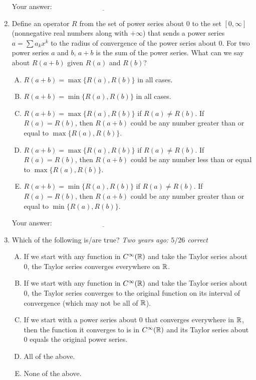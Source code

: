 \documentclass[10pt]{amsart}
\begin{document}
\begin{enumerate}
  \vspace{0.05in}
  Your answer: $\underline{\qquad\qquad\qquad\qquad\qquad\qquad\qquad}$
  \vspace{0.05in}

\item Define an operator $R$ from the set of power series about $0$
  to the set $[0,\infty]$ (nonnegative real numbers along with
  $+\infty$) that sends a power series $a = \sum a_kx^k$ to the radius
  of convergence of the power series about $0$. For two power series
  $a$ and $b$, $a + b$ is the sum of the power series. What can we say
  about $R(a + b)$ given $R(a)$ and $R(b)$?

  \begin{enumerate}[(A)]
  \item $R(a + b) = \max \{ R(a), R(b) \}$ in all cases.
  \item $R(a + b) = \min \{ R(a), R(b) \}$ in all cases.
  \item $R(a + b) = \max \{ R(a), R(b) \}$ if $R(a) \ne R(b)$. If
    $R(a) = R(b)$, then $R(a + b)$ could be any number greater than or
    equal to $\max \{ R(a), R(b) \}$.
  \item $R(a + b) = \max \{ R(a), R(b) \}$ if $R(a) \ne R(b)$. If
    $R(a) = R(b)$, then $R(a + b)$ could be any number less than or
    equal to $\max \{ R(a), R(b) \}$.
  \item $R(a + b) = \min \{ R(a), R(b) \}$ if $R(a) \ne R(b)$. If
    $R(a) = R(b)$, then $R(a + b)$ could be any number greater than or
    equal to $\min \{ R(a), R(b) \}$.
  \end{enumerate}

  \vspace{0.05in}
  Your answer: $\underline{\qquad\qquad\qquad\qquad\qquad\qquad\qquad}$
  \vspace{0.05in}

\item Which of the following is/are true? {\em Two years ago: $5/26$ correct}

  \begin{enumerate}[(A)]
  \item If we start with any function in $C^\infty(\mathbb{R})$ and take the
    Taylor series about $0$, the Taylor series converges everywhere on
    $\mathbb{R}$.
  \item If we start with any function in $C^\infty(\mathbb{R})$ and take the
    Taylor series about $0$, the Taylor series converges to the
    original function on its interval of convergence (which may not be
    all of $\mathbb{R}$).
  \item If we start with a power series about $0$ that converges
    everywhere in $\mathbb{R}$, then the function it converges to is in
    $C^\infty(\mathbb{R})$ and its Taylor series about $0$ equals the original
    power series.
  \item All of the above.
  \item None of the above.
  \end{enumerate}


\end{enumerate}
\end{document}
